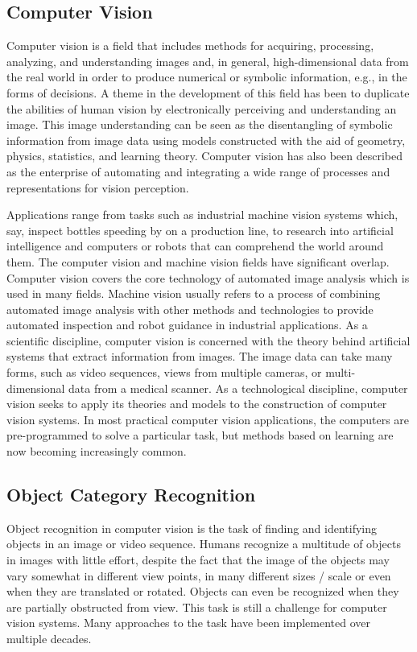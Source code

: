 \subsection{Computer Vision}

Computer vision is a field that includes methods for acquiring, processing, analyzing, and understanding images and, in general, high-dimensional data from the real world in order to produce numerical or symbolic information, e.g., in the forms of decisions. A theme in the development of this field has been to duplicate the abilities of human vision by electronically perceiving and understanding an image. This image understanding can be seen as the disentangling of symbolic information from image data using models constructed with the aid of geometry, physics, statistics, and learning theory. Computer vision has also been described as the enterprise of automating and integrating a wide range of processes and representations for vision perception.

Applications range from tasks such as industrial machine vision systems which, say, inspect bottles speeding by on a production line, to research into artificial intelligence and computers or robots that can comprehend the world around them. The computer vision and machine vision fields have significant overlap. Computer vision covers the core technology of automated image analysis which is used in many fields. Machine vision usually refers to a process of combining automated image analysis with other methods and technologies to provide automated inspection and robot guidance in industrial applications. As a scientific discipline, computer vision is concerned with the theory behind artificial systems that extract information from images. The image data can take many forms, such as video sequences, views from multiple cameras, or multi-dimensional data from a medical scanner. As a technological discipline, computer vision seeks to apply its theories and models to the construction of computer vision systems. In most practical computer vision applications, the computers are pre-programmed to solve a particular task, but methods based on learning are now becoming increasingly common.

\subsection{Object Category Recognition}

Object recognition in computer vision is the task of finding and identifying objects in an image or video sequence. Humans recognize a multitude of objects in images with little effort, despite the fact that the image of the objects may vary somewhat in different view points, in many different sizes / scale or even when they are translated or rotated. Objects can even be recognized when they are partially obstructed from view. This task is still a challenge for computer vision systems. Many approaches to the task have been implemented over multiple decades.

